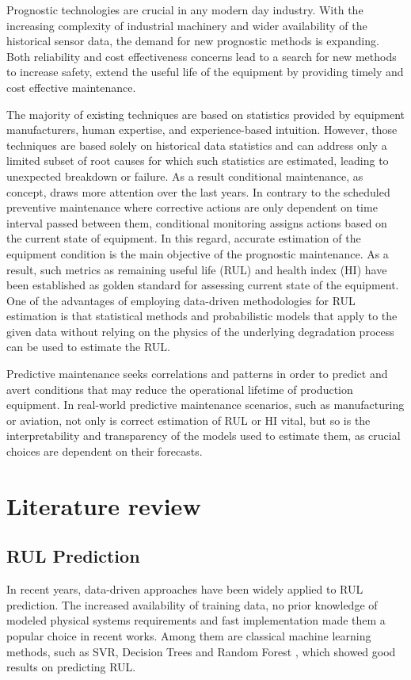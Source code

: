 
Prognostic technologies are crucial in any modern day industry. With the increasing complexity of industrial machinery and wider availability of the historical sensor data, the demand for new prognostic methods is expanding. Both reliability and cost effectiveness concerns lead to a search for new methods to increase safety, extend the useful life of the equipment by providing timely and cost effective maintenance. 

The majority of existing techniques are based on statistics provided by equipment manufacturers, human expertise, and experience-based intuition. However, those techniques are based solely on historical data statistics and can address only a limited subset of root causes for which such statistics are estimated, leading to unexpected breakdown or failure. As a result conditional maintenance, as concept, draws more attention over the last years. In contrary to the scheduled preventive maintenance where corrective actions  are only dependent on time interval passed between them, conditional monitoring assigns actions based on the current state of equipment. In this regard, accurate estimation of the equipment condition is the main objective of the prognostic maintenance. As a result, such metrics as remaining useful life (RUL) and health index (HI) have been established as golden standard \cite{cerquitelli2021predictive} for assessing current state of the equipment. One of the advantages of employing data-driven methodologies for RUL estimation is that statistical methods and probabilistic models that apply to the given data without relying on the physics of the underlying degradation process can be used to estimate the RUL.

Predictive maintenance seeks correlations and patterns in order to predict and avert conditions that may reduce the operational lifetime of production equipment.
In real-world predictive maintenance scenarios, such as manufacturing or aviation, not only is correct estimation of RUL or HI vital, but so is the interpretability and transparency of the models used to estimate them, as crucial choices are dependent on their forecasts.



\section{Literature review}
\subsection{RUL Prediction}
In recent years, data-driven approaches have been widely applied to RUL prediction. The increased availability of training data, no prior knowledge of modeled physical systems requirements and fast implementation made them a popular choice in recent works.  Among them are classical machine learning methods, such as SVR, Decision Trees and Random Forest \cite{Wang2015, Sangram201887623}, which showed good results on predicting RUL.   

